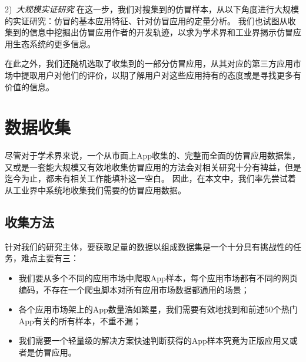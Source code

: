 2)\ \emph{大规模实证研究} \quad
在这一步，我们对搜集到的仿冒样本，从以下角度进行大规模的实证研究：仿冒的基本应用特征、针对仿冒应用的定量分析。
我们也试图从收集到的信息中挖掘出仿冒应用作者的开发轨迹，以求为学术界和工业界揭示仿冒应用生态系统的更多信息。

在此之外，我们还随机选取了收集到的一部分仿冒应用，从其对应的第三方应用市场中提取用户对他们的评价，以期了解用户对这些应用持有的态度或是寻找更多有价值的信息。

\section{数据收集}
尽管对于学术界来说，一个从市面上App收集的、完整而全面的仿冒应用数据集，又或是一套能大规模又有效地收集仿冒应用的方法会对相关研究十分有裨益，但是迄今为止，都未有相关工作能填补这一空白。
因此，在本文中，我们率先尝试着从工业界中系统地收集我们需要的仿冒应用数据。

\subsection{收集方法}
针对我们的研究主体，要获取足量的数据以组成数据集是一个十分具有挑战性的任务，难点主要有三：
\begin{itemize}
	\item 我们要从多个不同的应用市场中爬取App样本，每个应用市场都有不同的网页编码，不存在一个爬虫脚本对所有应用市场数据都通用的场景；
	\item 各个应用市场架上的App数量浩如繁星，我们需要有效地找到和前述50个热门App有关的所有样本，不重不漏；
	\item 我们需要一个轻量级的解决方案快速判断获得的App样本究竟为正版应用又或者是仿冒应用。
\end{itemize}

